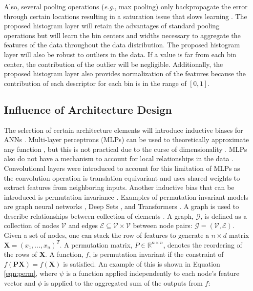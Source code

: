 \documentclass[journal]{IEEEtai}
\begin{document}
	Also, several pooling operations (\textit{e.g.}, max pooling) only backpropagate the error through certain locations resulting in a saturation issue that slows learning \cite{yu2014mixed}. The proposed histogram layer will retain the advantages of standard pooling operations but will learn the bin centers and widths necessary to aggregate the features of the data throughout the data distribution.  The proposed histogram layer will also be robust to outliers in the data. If a value is far from each bin center, the contribution of the outlier will be negligible. Additionally, the proposed histogram layer also provides normalization of the features because the contribution of each descriptor for each bin is in the range of $[0,1]$.
	
	\subsection{Influence of Architecture Design}
	The selection of certain architecture elements will introduce inductive biases for ANNs \mbox{\cite{neyshabur2015search,xu2021positional,phuong2020inductive,bronstein2021geometric}}. Multi-layer perceptrons (MLPs) can be used to theoretically approximate any function {\cite{pinkus1999approximation}}, but this is not practical due to the curse of dimensionality \mbox{\cite{bronstein2021geometric}}. MLPs also do not have a mechanism to account for local relationships in the data \mbox{\cite{bronstein2021geometric,Goodfellow-et-al-2016}}. Convolutional layers were introduced to account for this limitation of MLPs as the convolution operation is translation equivariant \mbox{\cite{bronstein2021geometric,Goodfellow-et-al-2016}} and uses shared weights to extract features from neighboring inputs.   Another inductive bias that can be introduced is permutation invariance \mbox{\cite{bronstein2021geometric}}. Examples of permutation invariant models are graph neural networks \mbox{\cite{bronstein2021geometric,xu2018powerful}}, Deep Sets \mbox{\cite{zaheer2017deep}}, and Transformers \mbox{\cite{vaswani2017attention}}. A graph is used to describe relationships between collection of elements \mbox{\cite{xu2018powerful,bronstein2021geometric}}. A graph, $\mathcal{G}$, is defined as a collection of nodes $\mathcal{V}$ and edges $\mathcal{E} \subseteq \mathcal{V} \times \mathcal{V}$ between node pairs: $\mathcal{G} = (\mathcal{V},\mathcal{E})$. Given a set of nodes, one can stack the row of features to generate a $n \times d$ matrix $\mathbf{X} = (x_1,...,x_n)^T$. A permutation matrix, $P \in \mathbb{R}^{n \times n}$, denotes the reordering of the rows of $\mathbf{X}$. A function, $f$, is permutation invariant if the constraint of $f(\mathbf{PX}) = f(\mathbf{X})$ is satisfied. An example of this is shown in Equation {\ref{eqn:perm}}, where $\psi$ is a function applied independently to each node's feature vector and $\phi$ is applied to the aggregated sum of the outputs from $f$: 
\end{document}
